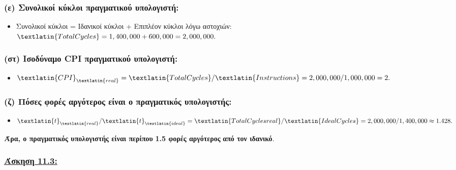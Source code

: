 \documentclass{article}
\begin{document}
\subsubsection*{\textbf{(ε) Συνολικοί κύκλοι πραγματικού υπολογιστή}:}
\begin{itemize}
    \item {Συνολικοί κύκλοι = Ιδανικοί κύκλοι + Επιπλέον κύκλοι λόγω αστοχιών}: \\
    $ \textlatin{Total Cycles} = 1,400,000 + 600,000 = 2,000,000. $
\end{itemize}

\subsubsection*{\textbf{(στ) Ισοδύναμο} \textlatin{CPI} \textbf{πραγματικού υπολογιστή}:}
\begin{itemize}
    \item $ \textlatin{CPI}_{\textlatin{real}} = {\textlatin{Total Cycles}}/{\textlatin{Instructions}} =  {2,000,000}/{1,000,000} = 2. $
\end{itemize}
 

\subsubsection*{\textbf{(ζ) Πόσες φορές αργότερος είναι ο πραγματικός υπολογιστής}:}
\begin{itemize}
    \item $ {\textlatin{t}_{\textlatin{real}}}/{\textlatin{t}_{\textlatin{ideal}}} =  {\textlatin{Total Cycles real}}/{\textlatin{Ideal Cycles}} =  {2,000,000}/{1,400,000}  \approx 1.428. $
\end{itemize}
\hspace{0.35cm}
\textbf{Άρα, ο πραγματικός υπολογιστής είναι περίπου} \textbf{1.5 φορές αργότερος} \textbf{από τον ιδανικό}.
















 

\newpage

\vspace{2.5cm}
\subsubsection*{\underline{\textbf{Άσκηση 11.3:}}}
\vspace{0.75cm}
\end{document}
